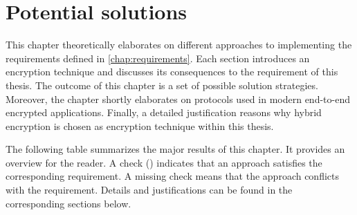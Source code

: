\documentclass[../main.tex]{subfiles}
\begin{document}
\chapter{Potential solutions}
\label{chap:overview}

This chapter theoretically elaborates on different approaches to implementing the requirements defined in \cref{chap:requirements}.
Each section introduces an encryption technique and discusses its consequences to the requirement of this thesis.
The outcome of this chapter is a set of possible solution strategies.
Moreover, the chapter shortly elaborates on protocols used in modern end-to-end encrypted applications. 
Finally, a detailed justification reasons why hybrid encryption is chosen as encryption technique within this thesis.

The following table summarizes the major results of this chapter.
It provides an overview for the reader.
A check (\checkmark) indicates that an approach satisfies the corresponding requirement.
A missing check means that the approach conflicts with the requirement.
Details and justifications can be found in the corresponding sections below.
\end{document}

